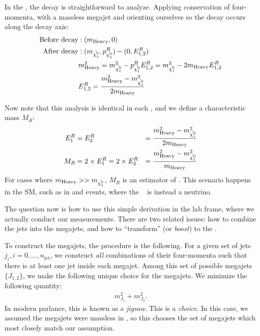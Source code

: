 In the \rframe, the decay is straightforward to analyze.
Applying conservation of four-momenta, with a massless megajet and orienting ourselves so the decay occurs along the decay axis:
\begin{align}
\text{Before decay}  & : (m_{\mathrm{Heavy}}, 0)   \nonumber \\
\text{After decay}   & : (m_{\tilde{\chi^0_1}},   p_{ \tilde{\chi^0_1} }^R) -  (0, E_{1,2}^R)                                             \nonumber \\
                     & m_{\mathrm{Heavy}}^2 = m_{\tilde{\chi^0_1}}^2 - p_{ \tilde{\chi^0_1} }^R E_{1,2}^R = m_{\tilde{\chi^0_1}}^2 - 2 m_{\mathrm{Heavy}} E_{1,2}^R  \\
                     & E_{1,2}^R = \frac{m_{\mathrm{Heavy}}^2 - m_{\tilde{\chi^0_1}}^2}{2 m_{\mathrm{Heavy}}} \nonumber
\end{align}

Now note that this analysis is identical in each \rframe, and we define a characteristic mass $M_R$:
\begin{alignat}{3}\label{eq:mr}
E_1^R &= E_2^R &= \frac{m_{\mathrm{Heavy}}^2 - m_{\tilde{\chi^0_1}}^2}{ 2 m_{\mathrm{Heavy}} } \\
M_R &= 2 \times E_1^R = 2 \times E_2^R &= \frac{m_{\mathrm{Heavy}}^2 - m_{\tilde{\chi^0_1}}^2}{m_{\mathrm{Heavy}} } \nonumber
\end{alignat}
For cases where $m_{\mathrm{Heavy}} >> m_{\tilde{\chi^0_1}}$, $M_R$ is an estimator of \mheavy.
This scenario happens in the SM, such as in \ttbar and \WW events, where the \lsp~ is instead a neutrino.

The question now is how to use this simple derivation in the lab frame, where we actually conduct our measurements.
There are two related issues: how to combine the jets into the megajets, and how to ``transform'' (or \textit{boost}) to the \rframe.

To construct the megajets, the procedure is the following.
For a given set of jets $j_i, i = 0 , ... , n_{\mathrm{jet}}$, we construct \textit{all} combinations of their four-momenta such that there is at least one jet inside each megajet.
Among this set of possible megajets $\{J_{1,2}\}$, we make the following unique choice for the megajets.
We minimize the following quantity:
\begin{align}
m_{J_1}^2 + m_{J_2}^2.
\end{align}
In modern parlance, this is known as a \textit{jigsaw}.
This is a \textit{choice}.
In this case, we assumed the megajets were massless in , so this chooses the set of megajets which most closely match our assumption.

